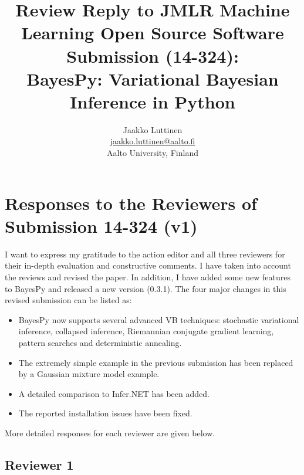 \documentclass{article}
\title{Review Reply to JMLR Machine Learning Open Source Software Submission (14-324):\\
BayesPy: Variational Bayesian Inference in Python}
\author{Jaakko Luttinen\\
  \url{jaakko.luttinen@aalto.fi}\\
    Aalto University, Finland}
\begin{document}
\maketitle

\section{Responses to the Reviewers of Submission 14-324 (v1)}

I want to express my gratitude to the action editor and all three reviewers for
their in-depth evaluation and constructive comments.  I have taken into account
the reviews and revised the paper.  In addition, I have added some new features
to BayesPy and released a new version (0.3.1).  The four major changes in this
revised submission can be listed as:
\begin{itemize}

\item BayesPy now supports several advanced VB techniques: stochastic
  variational inference, collapsed inference, Riemannian conjugate gradient
  learning, pattern searches and deterministic annealing.

\item The extremely simple example in the previous submission has been replaced
  by a Gaussian mixture model example.

\item A detailed comparison to Infer.NET has been added.

\item The reported installation issues have been fixed.

\end{itemize}
More detailed responses for each reviewer are given below.







\subsection{Reviewer 1}
\end{document}
